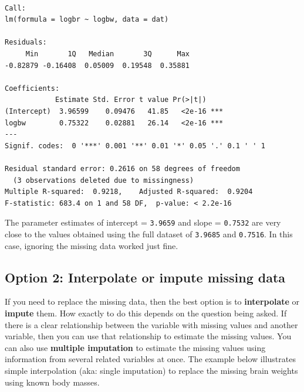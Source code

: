 \documentclass[
  13,
  letterpaper,
]{report}
\newenvironment{Shaded}{\begin{snugshade}}{\end{snugshade}}
\newcommand{\AttributeTok}[1]{\textcolor[rgb]{0.40,0.45,0.13}{#1}}
\newcommand{\FunctionTok}[1]{\textcolor[rgb]{0.28,0.35,0.67}{#1}}
\newcommand{\NormalTok}[1]{\textcolor[rgb]{0.00,0.23,0.31}{#1}}
\newcommand{\OtherTok}[1]{\textcolor[rgb]{0.00,0.23,0.31}{#1}}
\newcommand{\SpecialCharTok}[1]{\textcolor[rgb]{0.37,0.37,0.37}{#1}}
\begin{document}
\begin{Shaded}
\end{Shaded}

\begin{verbatim}

Call:
lm(formula = logbr ~ logbw, data = dat)

Residuals:
     Min       1Q   Median       3Q      Max 
-0.82879 -0.16408  0.05009  0.19548  0.35881 

Coefficients:
            Estimate Std. Error t value Pr(>|t|)    
(Intercept)  3.96599    0.09476   41.85   <2e-16 ***
logbw        0.75322    0.02881   26.14   <2e-16 ***
---
Signif. codes:  0 '***' 0.001 '**' 0.01 '*' 0.05 '.' 0.1 ' ' 1

Residual standard error: 0.2616 on 58 degrees of freedom
  (3 observations deleted due to missingness)
Multiple R-squared:  0.9218,    Adjusted R-squared:  0.9204 
F-statistic: 683.4 on 1 and 58 DF,  p-value: < 2.2e-16
\end{verbatim}

The parameter estimates of intercept = \texttt{3.9659} and slope =
\texttt{0.7532} are very close to the values obtained using the full
dataset of \texttt{3.9685} and \texttt{0.7516}. In this case, ignoring
the missing data worked just fine.

\subsection{Option 2: Interpolate or impute missing
data}\label{sec-problems-miss-inter}

If you need to replace the missing data, then the best option is to
\textbf{interpolate} or \textbf{impute} them. How exactly to do this
depends on the question being asked. If there is a clear relationship
between the variable with missing values and another variable, then you
can use that relationship to estimate the missing values. You can also
use \textbf{multiple imputation} to estimate the missing values using
information from several related variables at once. The example below
illustrates simple interpolation (aka: single imputation) to replace the
missing brain weights using known body masses.
\end{document}
